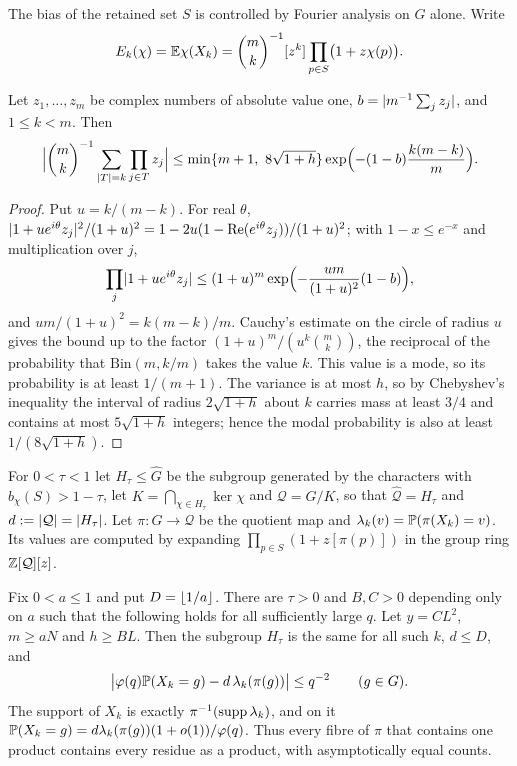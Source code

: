 The bias of the retained set $S$ is controlled by Fourier analysis on $G$ alone. Write
\[
 E_k(\chi)=\mathbb{E}\chi(X_k)=\binom mk^{-1}[z^k]\prod_{p\in S}\bigl(1+z\chi(p)\bigr).
\]

\begin{lemma}\label{dir:lem:circle}
Let $z_1,\dots,z_m$ be complex numbers of absolute value one, $b=\lvert m^{-1}\sum_jz_j\rvert$, and
$1\le k<m$. Then
\[
 \Bigl|\binom mk^{-1}\sum_{\abs T=k}\prod_{j\in T}z_j\Bigr|
 \le\min\set{m+1,\ 8\sqrt{1+h}}\exp\Bigl(-(1-b)\frac{k(m-k)}m\Bigr).
\]
\end{lemma}

\begin{proof}
Put $u=k/(m-k)$. For real $\theta$, $\lvert1+ue^{i\theta}z_j\rvert^2/(1+u)^2
=1-2u(1-\operatorname{Re}(e^{i\theta}z_j))/(1+u)^2$; with $1-x\le e^{-x}$ and multiplication over $j$,
\[
 \prod_j\lvert1+ue^{i\theta}z_j\rvert\le(1+u)^m\exp\Bigl(-\frac{um}{(1+u)^2}(1-b)\Bigr),
\]
and $um/(1+u)^2=k(m-k)/m$. Cauchy's estimate on the circle of radius $u$ gives the bound up to
the factor $(1+u)^m/(u^k\binom mk)$, the reciprocal of the probability that
$\mathrm{Bin}(m,k/m)$ takes the value $k$. This value is a mode, so its probability is at least
$1/(m+1)$. The variance is at most $h$, so by Chebyshev's inequality the interval of radius
$2\sqrt{1+h}$ about $k$ carries mass at least $3/4$ and contains at most $5\sqrt{1+h}$
integers; hence the modal probability is also at least $1/(8\sqrt{1+h})$.
\end{proof}

For $0<\tau<1$ let $H_\tau\le\widehat G$ be the subgroup generated by the characters with
$b_\chi(S)>1-\tau$, let $K=\bigcap_{\chi\in H_\tau}\ker\chi$ and $\mathcal Q=G/K$, so that
$\widehat{\mathcal Q}=H_\tau$ and $d:=\lvert\mathcal Q\rvert=\lvert H_\tau\rvert$. Let $\pi\colon G\to\mathcal Q$
be the quotient map and $\lambda_k(v)=\mathbb{P}(\pi(X_k)=v)$. Its values are computed by expanding
$\prod_{p\in S}(1+z[\pi(p)])$ in the group ring $\mathbb{Z}[\mathcal Q][z]$.

\begin{theorem}\label{dir:thm:quotient}
Fix $0<a\le1$ and put $D=\lfloor1/a\rfloor$. There are $\tau>0$ and $B,C>0$ depending only on $a$
such that the following holds for all sufficiently large $q$. Let $y=CL^2$, $m\ge aN$ and
$h\ge BL$. Then the subgroup $H_\tau$ is the same for all such $k$, $d\le D$, and
\begin{equation}\label{dir:eq:profile}
 \bigl|\varphi(q)\mathbb{P}(X_k=g)-d\,\lambda_k(\pi(g))\bigr|\le q^{-2}\qquad(g\in G).
\end{equation}
The support of $X_k$ is exactly $\pi^{-1}(\operatorname{supp}\lambda_k)$, and on it
$\mathbb{P}(X_k=g)=d\lambda_k(\pi(g))(1+o(1))/\varphi(q)$. Thus every fibre of $\pi$ that contains
one product contains every residue as a product, with asymptotically equal counts.
\end{theorem}

